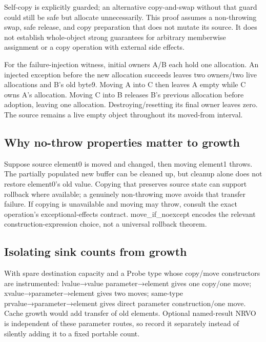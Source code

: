 Self-copy is explicitly guarded; an alternative copy-and-swap without that guard could still be safe but allocate unnecessarily. This proof assumes a non-throwing swap, safe release, and copy preparation that does not mutate its source. It does not establish whole-object strong guarantees for arbitrary memberwise assignment or a copy operation with external side effects.

For the failure-injection witness, initial owners A/B each hold one allocation. An injected exception before the new allocation succeeds leaves two owners/two live allocations and B's old byte9. Moving A into C then leaves A empty while C owns A's allocation. Moving C into B releases B's previous allocation before adoption, leaving one allocation. Destroying/resetting its final owner leaves zero. The source remains a live empty object throughout its moved-from interval.

\subsection{Why no-throw properties matter to growth}\label{03-visual-computing-i-ch018-why-no-throw-properties-matter-to-growth}

Suppose source element0 is moved and changed, then moving element1 throws. The partially populated new buffer can be cleaned up, but cleanup alone does not restore element0's old value. Copying that preserves source state can support rollback where available; a genuinely non-throwing move avoids that transfer failure. If copying is unavailable and moving may throw, consult the exact operation's exceptional-effects contract. move\_if\_noexcept encodes the relevant construction-expression choice, not a universal rollback theorem.

\subsection{Isolating sink counts from growth}\label{03-visual-computing-i-ch018-isolating-sink-counts-from-growth}

With spare destination capacity and a Probe type whose copy/move constructors are instrumented: lvalue→value parameter→element gives one copy/one move; xvalue→parameter→element gives two moves; same-type prvalue→parameter→element gives direct parameter construction/one move. Cache growth would add transfer of old elements. Optional named-result NRVO is independent of these parameter routes, so record it separately instead of silently adding it to a fixed portable count.

